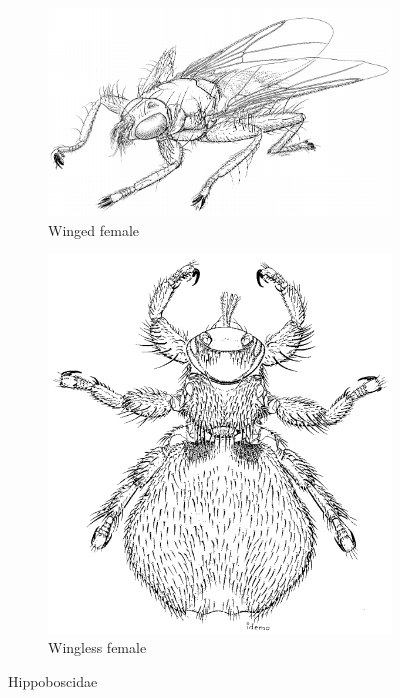 \documentclass[letterpaper, 11pt]{article}
\begin{document}
\begin{figure}[ht!]
    \centering
    \begin{subfigure}[ht!]{0.45\textwidth}
        \includegraphics[width=\textwidth]{HippoboscidHabitus}
        \caption{Winged female \citep[][Fig. 111.1]{mcalpine1981manualv2}}
        \label{fig:hippoboscid1}
    \end{subfigure}
    \qquad
    \begin{subfigure}[ht!]{0.35\textwidth}
        \includegraphics[width=\textwidth]{HippoboscidFemale}
        \caption{Wingless female \citep[][Fig. 111.36]{mcalpine1981manualv2}}
        \label{fig:hippoboscid2}
    \end{subfigure}
    \caption{Hippoboscidae}\label{fig:hippoboscids}
\end{figure}
\end{document}
